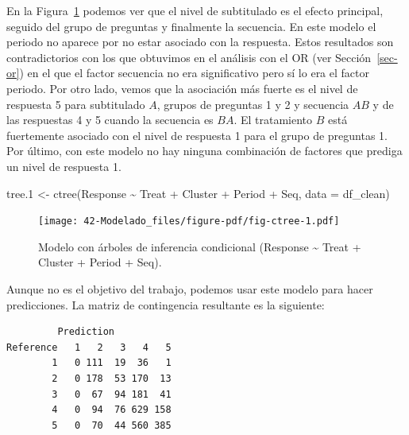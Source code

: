 \documentclass[
  12pt,
  a4paper,
  extrafontsizes,
  onecolumn,
  openright]{memoir}
\newenvironment{Shaded}{\begin{snugshade}}{\end{snugshade}}
\newcommand{\AttributeTok}[1]{\textcolor[rgb]{0.40,0.45,0.13}{#1}}
\newcommand{\FloatTok}[1]{\textcolor[rgb]{0.68,0.00,0.00}{#1}}
\newcommand{\FunctionTok}[1]{\textcolor[rgb]{0.28,0.35,0.67}{#1}}
\newcommand{\NormalTok}[1]{\textcolor[rgb]{0.00,0.23,0.31}{#1}}
\newcommand{\OtherTok}[1]{\textcolor[rgb]{0.00,0.23,0.31}{#1}}
\newcommand{\SpecialCharTok}[1]{\textcolor[rgb]{0.37,0.37,0.37}{#1}}
\begin{document}
En la Figura~\ref{fig-ctree} podemos ver que el nivel de subtitulado es
el efecto principal, seguido del grupo de preguntas y finalmente la
secuencia. En este modelo el periodo no aparece por no estar asociado
con la respuesta. Estos resultados son contradictorios con los que
obtuvimos en el análisis con el OR (ver Sección~\ref{sec-or}) en el que
el factor secuencia no era significativo pero sí lo era el factor
periodo. Por otro lado, vemos que la asociación más fuerte es el nivel
de respuesta 5 para subtitulado \(A\), grupos de preguntas 1 y 2 y
secuencia \(AB\) y de las respuestas 4 y 5 cuando la secuencia es
\(BA\). El tratamiento \(B\) está fuertemente asociado con el nivel de
respuesta 1 para el grupo de preguntas 1. Por último, con este modelo no
hay ninguna combinación de factores que prediga un nivel de respuesta 1.

\scriptsize

\begin{Shaded}
\begin{Highlighting}[]
\NormalTok{tree}\FloatTok{.1} \OtherTok{\textless{}{-}} \FunctionTok{ctree}\NormalTok{(Response }\SpecialCharTok{\textasciitilde{}}\NormalTok{ Treat }\SpecialCharTok{+}\NormalTok{ Cluster }\SpecialCharTok{+}\NormalTok{ Period }\SpecialCharTok{+}\NormalTok{ Seq, }\AttributeTok{data =}\NormalTok{ df\_clean)}
\end{Highlighting}
\end{Shaded}

\normalsize

\begin{figure}[h]

{\centering \texttt{[image: 42-Modelado\_files/figure-pdf/fig-ctree-1.pdf]}

}

\caption{\label{fig-ctree}Modelo con árboles de inferencia condicional
(Response \textasciitilde{} Treat + Cluster + Period + Seq).}

\end{figure}

Aunque no es el objetivo del trabajo, podemos usar este modelo para
hacer predicciones. La matriz de contingencia resultante es la
siguiente:

\scriptsize

\begin{verbatim}
         Prediction
Reference   1   2   3   4   5
        1   0 111  19  36   1
        2   0 178  53 170  13
        3   0  67  94 181  41
        4   0  94  76 629 158
        5   0  70  44 560 385
\end{verbatim}
\end{document}
